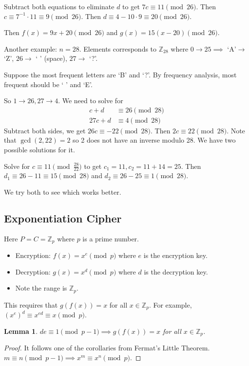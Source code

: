 \documentclass[letterpaper,12pt,oneside]{article}
\newtheorem*{lemma}{Lemma}
\begin{document}
Subtract both equations to eliminate $d$ to get $7c\equiv 11 \pmod {26}$. Then $c\equiv 7^{-1}\cdot 11 \equiv 9 \pmod {26}$. Then $d\equiv 4-10\cdot 9 \equiv 20 \pmod {26}$.

Then $f(x)=9x+20 \pmod {26}$ and $g(x)=15(x-20) \pmod {26}$.

Another example: $n=28$. Elements corresponds to $\mathbb{Z}_{28}$ where $0\to 25 \implies$ `A'$\to$`Z', $26 \to$ ` ' (space), $27\to$ `?'.

Suppose the most frequent letters are `B' and `?'. By frequency analysis, most frequent should be ` ' and `E'. 

So $1\to 26, 27\to 4$. We need to solve for \begin{align*}
    c + d &\equiv 26 \pmod {28} \\
    27c+d &\equiv 4 \pmod {28}
\end{align*} 
Subtract both sides, we get $26c\equiv -22 \pmod {28}$. Then $2c\equiv 22 \pmod {28}$. Note that $\gcd(2,22)=2$ so 2 does not have an inverse modulo 28. We have two possible solutions for it. 

Solve for $c\equiv 11 \pmod {\frac{28}{22}}$ to get $c_1 = 11, c_2 = 11+14 = 25$. Then $d_1\equiv 26-11 \equiv 15 \pmod {28}$ and $d_2\equiv 26-25 \equiv 1 \pmod {28}$.

We try both to see which works better. 
\subsection{Exponentiation Cipher}
Here $P=C=\mathbb{Z}_p$ where $p$ is a prime number. 
\begin{itemize}
    \item Encryption: $f(x)=x^e \pmod p$ where $e$ is the encryption key.
    \item Decryption: $g(x)=x^d \pmod p$ where $d$ is the decryption key.
    \item Note the range is $\mathbb{Z}_p$.
\end{itemize}
This requires that $g(f(x))=x$ for all $x\in \mathbb{Z}_p$. For example, $(x^e)^d \equiv x^{ed} \equiv x \pmod p$.

\begin{lemma}
    $de\equiv 1 \pmod {p-1} \implies g(f(x))=x$ for all $x\in \mathbb{Z}_p$.
\end{lemma}

\begin{proof}
    It follows one of the corollaries from Fermat's Little Theorem. $m\equiv n \pmod {p-1} \implies x^m\equiv x^n \pmod p$.
\end{proof}
\end{document}
